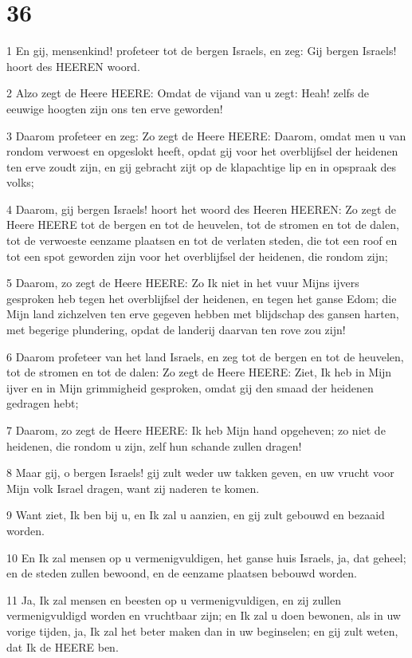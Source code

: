 \chapter{36}

\par 1 En gij, mensenkind! profeteer tot de bergen Israels, en zeg: Gij bergen Israels! hoort des HEEREN woord.
\par 2 Alzo zegt de Heere HEERE: Omdat de vijand van u zegt: Heah! zelfs de eeuwige hoogten zijn ons ten erve geworden!
\par 3 Daarom profeteer en zeg: Zo zegt de Heere HEERE: Daarom, omdat men u van rondom verwoest en opgeslokt heeft, opdat gij voor het overblijfsel der heidenen ten erve zoudt zijn, en gij gebracht zijt op de klapachtige lip en in opspraak des volks;
\par 4 Daarom, gij bergen Israels! hoort het woord des Heeren HEEREN: Zo zegt de Heere HEERE tot de bergen en tot de heuvelen, tot de stromen en tot de dalen, tot de verwoeste eenzame plaatsen en tot de verlaten steden, die tot een roof en tot een spot geworden zijn voor het overblijfsel der heidenen, die rondom zijn;
\par 5 Daarom, zo zegt de Heere HEERE: Zo Ik niet in het vuur Mijns ijvers gesproken heb tegen het overblijfsel der heidenen, en tegen het ganse Edom; die Mijn land zichzelven ten erve gegeven hebben met blijdschap des gansen harten, met begerige plundering, opdat de landerij daarvan ten rove zou zijn!
\par 6 Daarom profeteer van het land Israels, en zeg tot de bergen en tot de heuvelen, tot de stromen en tot de dalen: Zo zegt de Heere HEERE: Ziet, Ik heb in Mijn ijver en in Mijn grimmigheid gesproken, omdat gij den smaad der heidenen gedragen hebt;
\par 7 Daarom, zo zegt de Heere HEERE: Ik heb Mijn hand opgeheven; zo niet de heidenen, die rondom u zijn, zelf hun schande zullen dragen!
\par 8 Maar gij, o bergen Israels! gij zult weder uw takken geven, en uw vrucht voor Mijn volk Israel dragen, want zij naderen te komen.
\par 9 Want ziet, Ik ben bij u, en Ik zal u aanzien, en gij zult gebouwd en bezaaid worden.
\par 10 En Ik zal mensen op u vermenigvuldigen, het ganse huis Israels, ja, dat geheel; en de steden zullen bewoond, en de eenzame plaatsen bebouwd worden.
\par 11 Ja, Ik zal mensen en beesten op u vermenigvuldigen, en zij zullen vermenigvuldigd worden en vruchtbaar zijn; en Ik zal u doen bewonen, als in uw vorige tijden, ja, Ik zal het beter maken dan in uw beginselen; en gij zult weten, dat Ik de HEERE ben.
